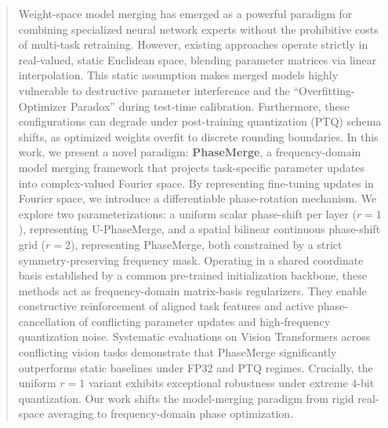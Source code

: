 \begin{abstract}
Weight-space model merging has emerged as a powerful paradigm for combining specialized neural network experts without the prohibitive costs of multi-task retraining. However, existing approaches operate strictly in real-valued, static Euclidean space, blending parameter matrices via linear interpolation. This static assumption makes merged models highly vulnerable to destructive parameter interference and the ``Overfitting-Optimizer Paradox'' during test-time calibration. Furthermore, these configurations can degrade under post-training quantization (PTQ) schema shifts, as optimized weights overfit to discrete rounding boundaries. In this work, we present a novel paradigm: \textbf{PhaseMerge}, a frequency-domain model merging framework that projects task-specific parameter updates into complex-valued Fourier space. By representing fine-tuning updates in Fourier space, we introduce a differentiable phase-rotation mechanism. We explore two parameterizations: a uniform scalar phase-shift per layer ($r=1$), representing U-PhaseMerge, and a spatial bilinear continuous phase-shift grid ($r=2$), representing PhaseMerge, both constrained by a strict symmetry-preserving frequency mask. Operating in a shared coordinate basis established by a common pre-trained initialization backbone, these methods act as frequency-domain matrix-basis regularizers. They enable constructive reinforcement of aligned task features and active phase-cancellation of conflicting parameter updates and high-frequency quantization noise. Systematic evaluations on Vision Transformers across conflicting vision tasks demonstrate that PhaseMerge significantly outperforms static baselines under FP32 and PTQ regimes. Crucially, the uniform $r=1$ variant exhibits exceptional robustness under extreme 4-bit quantization. Our work shifts the model-merging paradigm from rigid real-space averaging to frequency-domain phase optimization.
\end{abstract}